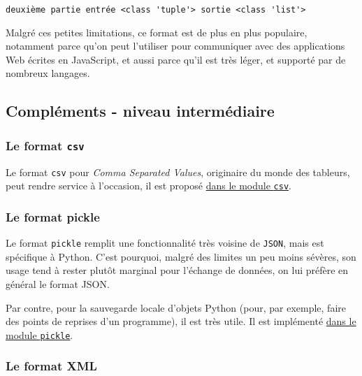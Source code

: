     \begin{Verbatim}[commandchars=\\\{\},frame=single,framerule=0.3mm,rulecolor=\color{cellframecolor}]
deuxième partie entrée <class 'tuple'> sortie <class 'list'>
\end{Verbatim}

    Malgré ces petites limitations, ce format est de plus en plus populaire,
notamment parce qu'on peut l'utiliser pour communiquer avec des
applications Web écrites en JavaScript, et aussi parce qu'il est très
léger, et supporté par de nombreux langages.

    \hypertarget{compluxe9ments---niveau-intermuxe9diaire}{%
\subsection{Compléments - niveau
intermédiaire}\label{compluxe9ments---niveau-intermuxe9diaire}}

    \hypertarget{le-format-csv}{%
\subsubsection{\texorpdfstring{Le format
\texttt{csv}}{Le format csv}}\label{le-format-csv}}

    Le format \texttt{csv} pour \emph{Comma Separated Values}, originaire du
monde des tableurs, peut rendre service à l'occasion, il est proposé
\href{https://docs.python.org/3/library/csv.html}{dans le module
\texttt{csv}}.

    \hypertarget{le-format-pickle}{%
\subsubsection{Le format pickle}\label{le-format-pickle}}

    Le format \texttt{pickle} remplit une fonctionnalité très voisine de
\texttt{JSON}, mais est spécifique à Python. C'est pourquoi, malgré des
limites un peu moins sévères, son usage tend à rester plutôt marginal
pour l'échange de données, on lui préfère en général le format JSON.

Par contre, pour la sauvegarde locale d'objets Python (pour, par
exemple, faire des points de reprises d'un programme), il est très
utile. Il est implémenté
\href{https://docs.python.org/3/library/pickle.html}{dans le module
\texttt{pickle}}.

    \hypertarget{le-format-xml}{%
\subsubsection{Le format XML}\label{le-format-xml}}

